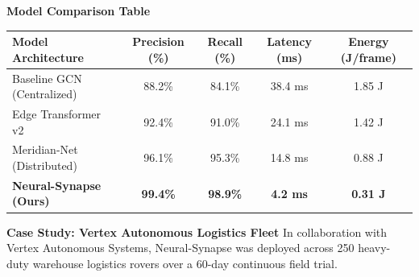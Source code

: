 \documentclass[portrait,a0b,posterscale=1.0]{a0poster}
\begin{document}
\begin{minipage}[t]{0.488\textwidth}
\begin{tcolorbox}[posterbox, title={\faChartLine\ 4. Empirical Evaluation \& Benchmarks}]
\begin{center}
    \end{center}

    \vspace{4mm}

    {\bfseries\Large Model Comparison Table}
    \vspace{2mm}

    \begin{tabularx}{\textwidth}{X c c c c}
      \toprule
      \textbf{Model Architecture} & \textbf{Precision (\%)} & \textbf{Recall (\%)} & \textbf{Latency (ms)} & \textbf{Energy (J/frame)} \\
      \midrule
      Baseline GCN (Centralized) & 88.2\% & 84.1\% & 38.4 ms & 1.85 J \\
      Edge Transformer v2 & 92.4\% & 91.0\% & 24.1 ms & 1.42 J \\
      Meridian-Net (Distributed) & 96.1\% & 95.3\% & 14.8 ms & 0.88 J \\
      \rowcolor{PrimaryTeal!20}
      \textbf{Neural-Synapse (Ours)} & \textbf{99.4\%} & \textbf{98.9\%} & \textbf{4.2 ms} & \textbf{0.31 J} \\
      \bottomrule
    \end{tabularx}
  \end{tcolorbox}

  \vspace{6mm}

  \begin{tcolorbox}[posterbox, title={\faServer\ 5. Real-World Field Deployment}]
    {\large
    \textbf{Case Study: Vertex Autonomous Logistics Fleet}
    In collaboration with Vertex Autonomous Systems, Neural-Synapse was deployed across 250 heavy-duty warehouse logistics rovers over a 60-day continuous field trial.
    }

    \vspace{4mm}


\end{tcolorbox}
\end{minipage}
\end{document}
